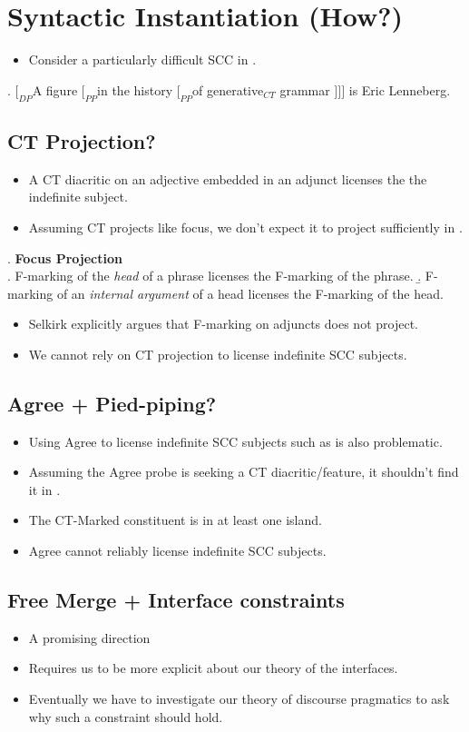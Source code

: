 \documentclass[letterpaper]{article}
\begin{document}
\section{Syntactic Instantiation (How?)}
\begin{itemize}
  \item Consider a particularly difficult SCC in \Next.
\end{itemize}
\ex. $[_{DP}$A figure $[_{PP}$in the history $[_{PP}$of generative$_{CT}$ grammar $]]]$ is Eric Lenneberg.

\subsection{CT Projection?}
\begin{itemize}
  \item A CT diacritic on an adjective embedded in an adjunct licenses the the indefinite subject.
  \item Assuming CT projects like focus, we don't expect it to project sufficiently in \Last.
\end{itemize}
\ex. \textbf{Focus Projection} \parencite{selkirk1996sentence}\\
\a. F-marking of the \textit{head} of a phrase licenses the F-marking of the phrase.
\b. F-marking of an \textit{internal argument} of a head licenses the F-marking of the head.

\begin{itemize}
  \item Selkirk explicitly argues that F-marking on adjuncts does not project.
  \item We cannot rely on CT projection to license indefinite SCC subjects.
\end{itemize}
\subsection{Agree + Pied-piping?}
\begin{itemize}
  \item Using Agree to license indefinite SCC subjects such as \LLast is also problematic.
  \item Assuming the Agree probe is seeking a CT diacritic/feature, it shouldn't find it in \LLast.
  \item The CT-Marked constituent is in at least one island.
  \item Agree cannot reliably license indefinite SCC subjects.
\end{itemize}
\subsection{Free Merge + Interface constraints}
\begin{itemize}
  \item A promising direction
  \item Requires us to be more explicit about our theory of the interfaces.
  \item Eventually we have to investigate our theory of discourse pragmatics to ask why such a constraint should hold.
\end{itemize}
\end{document}
